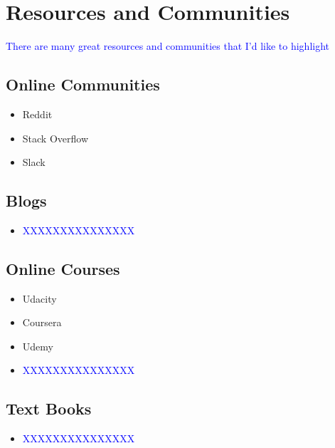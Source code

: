 \chapter{Resources and Communities}

\textcolor{blue}{There are many great resources and communities that I'd like to highlight}


\section{Online Communities}

\begin{itemize}[noitemsep,topsep=0pt]
	
	\item Reddit
	
	\item Stack Overflow
	
	\item Slack
\end{itemize}


\section{Blogs}

\begin{itemize}[noitemsep,topsep=0pt]
	
	\item \textcolor{blue}{XXXXXXXXXXXXXXX}
	
\end{itemize}



\section{Online Courses}

\begin{itemize}[noitemsep,topsep=0pt]
	
	\item Udacity
	\item Coursera
	\item Udemy
	
	\item \textcolor{blue}{XXXXXXXXXXXXXXX}
	
\end{itemize}


\section{Text Books}

\begin{itemize}[noitemsep,topsep=0pt]
	\item \textcolor{blue}{XXXXXXXXXXXXXXX}
	
\end{itemize}